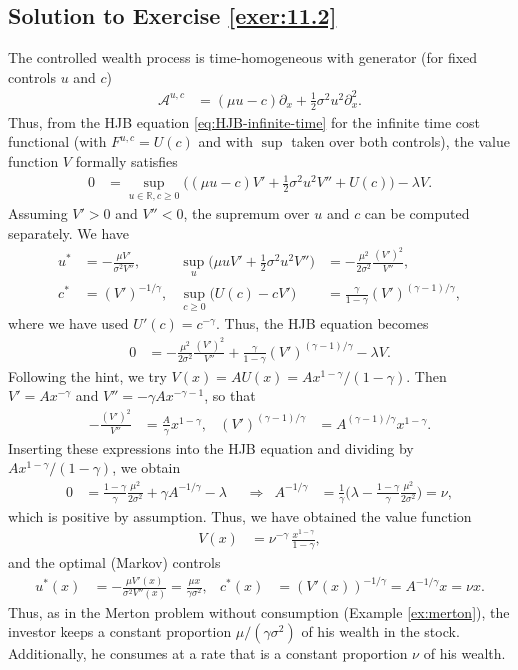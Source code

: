 \documentclass[12pt]{book}
\numberwithin{equation}{chapter}
\theoremstyle{plain}
\numberwithin{theorem}{section}
\theoremstyle{definition}
\numberwithin{exercise}{chapter}
\newcommand{\<}{\langle}
\renewcommand{\>}{\rangle}
\renewcommand{\(}{\left(}
\renewcommand{\)}{\right)}
\renewcommand{\[}{\left[}
\renewcommand{\]}{\right]}
\newcommand\Rb{\mathds{R}}
\newcommand\Ac{\mathscr{A}}
\newcommand\sig{\sigma}
\newcommand\gam{\gamma}
\newcommand\lam{\lambda}
\renewcommand\d{\partial}
\begin{document}
\subsection*{Solution to Exercise \ref{exer:11.2}}
The controlled wealth process is time-homogeneous with generator (for fixed controls $u$ and $c$)
\begin{align}
\Ac^{u,c}
	&=	( \mu u - c ) \d_x + \tfrac{1}{2} \sig^2 u^2 \d_x^2 .
\end{align}
Thus, from the HJB equation \eqref{eq:HJB-infinite-time} for the infinite time cost functional (with $F^{u,c} = U(c)$ and with $\sup$ taken over both controls), the value function $V$ formally satisfies
\begin{align}
0
	&=	\sup_{u \in \Rb , c \geq 0} \Big( ( \mu u - c ) V' + \tfrac{1}{2} \sig^2 u^2 V'' + U(c) \Big) - \lam V .
\end{align}
Assuming $V' > 0$ and $V'' < 0$, the supremum over $u$ and $c$ can be computed separately.  We have
\begin{align}
u^*
	&=	- \frac{\mu V'}{\sig^2 V''} , &
\sup_{u} \Big( \mu u V' + \tfrac{1}{2} \sig^2 u^2 V'' \Big)
	&=	- \frac{\mu^2}{2 \sig^2} \frac{(V')^2}{V''} , \\
c^*
	&=	(V')^{-1/\gam} , &
\sup_{c \geq 0} \Big( U(c) - c V' \Big)
	&=	\frac{\gam}{1-\gam} (V')^{(\gam-1)/\gam} ,
\end{align}
where we have used $U'(c) = c^{-\gam}$.  Thus, the HJB equation becomes
\begin{align}
0
	&=	- \frac{\mu^2}{2 \sig^2} \frac{(V')^2}{V''} + \frac{\gam}{1-\gam} (V')^{(\gam-1)/\gam} - \lam V .
\end{align}
Following the hint, we try $V(x) = A U(x) = A x^{1-\gam}/(1-\gam)$.  Then $V' = A x^{-\gam}$ and $V'' = - \gam A x^{-\gam-1}$, so that
\begin{align}
- \frac{(V')^2}{V''}
	&=	\frac{A}{\gam} x^{1-\gam} , &
(V')^{(\gam-1)/\gam}
	&=	A^{(\gam-1)/\gam} x^{1-\gam} .
\end{align}
Inserting these expressions into the HJB equation and dividing by $A x^{1-\gam}/(1-\gam)$, we obtain
\begin{align}
0
	&=	\frac{1-\gam}{\gam} \frac{\mu^2}{2 \sig^2} + \gam A^{-1/\gam} - \lam &
	&\Rightarrow&
A^{-1/\gam}
	&=	\frac{1}{\gam} \Big( \lam - \frac{1-\gam}{\gam} \frac{\mu^2}{2 \sig^2} \Big)
	=		\nu ,
\end{align}
which is positive by assumption.  Thus, we have obtained the value function
\begin{align}
V(x)
	&=	\nu^{-\gam} \, \frac{x^{1-\gam}}{1-\gam} ,
\end{align}
and the optimal (Markov) controls
\begin{align}
u^*(x)
	&=	- \frac{\mu V'(x)}{\sig^2 V''(x)}
	=		\frac{\mu x}{\gam \sig^2} , &
c^*(x)
	&=	(V'(x))^{-1/\gam}
	=		A^{-1/\gam} x
	=		\nu x .
\end{align}
Thus, as in the Merton problem without consumption (Example \ref{ex:merton}), the investor keeps a constant proportion $\mu/(\gam \sig^2)$ of his wealth in the stock.  Additionally, he consumes at a rate that is a constant proportion $\nu$ of his wealth.
\end{document}
